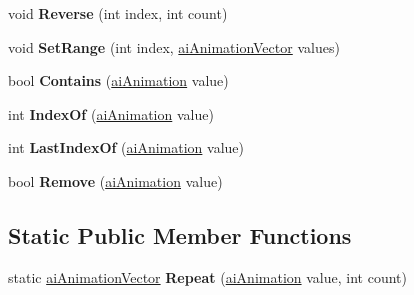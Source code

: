 \begin{DoxyCompactItemize}
\item 
\hypertarget{classai_animation_vector_a4d1511f222d1b415b7b143b6735d78fb}{void {\bfseries Reverse} (int index, int count)}\label{classai_animation_vector_a4d1511f222d1b415b7b143b6735d78fb}

\item 
\hypertarget{classai_animation_vector_ac37cdd8151e02c34596b12393e505fb6}{void {\bfseries Set\+Range} (int index, \hyperlink{classai_animation_vector}{ai\+Animation\+Vector} values)}\label{classai_animation_vector_ac37cdd8151e02c34596b12393e505fb6}

\item 
\hypertarget{classai_animation_vector_a5760273ff2895204a65b5662b5a41c82}{bool {\bfseries Contains} (\hyperlink{structai_animation}{ai\+Animation} value)}\label{classai_animation_vector_a5760273ff2895204a65b5662b5a41c82}

\item 
\hypertarget{classai_animation_vector_ad2d1a6fa3c05b11f18ac9f34e6bc17f1}{int {\bfseries Index\+Of} (\hyperlink{structai_animation}{ai\+Animation} value)}\label{classai_animation_vector_ad2d1a6fa3c05b11f18ac9f34e6bc17f1}

\item 
\hypertarget{classai_animation_vector_a4fd57d2551d32f7bbb6dcb59d753e4db}{int {\bfseries Last\+Index\+Of} (\hyperlink{structai_animation}{ai\+Animation} value)}\label{classai_animation_vector_a4fd57d2551d32f7bbb6dcb59d753e4db}

\item 
\hypertarget{classai_animation_vector_aeb48991f501377776566b969413dd92e}{bool {\bfseries Remove} (\hyperlink{structai_animation}{ai\+Animation} value)}\label{classai_animation_vector_aeb48991f501377776566b969413dd92e}

\end{DoxyCompactItemize}
\subsection*{Static Public Member Functions}
\begin{DoxyCompactItemize}
\item 
\hypertarget{classai_animation_vector_a183ed931824ecb2663b34c9ae650cafd}{static \hyperlink{classai_animation_vector}{ai\+Animation\+Vector} {\bfseries Repeat} (\hyperlink{structai_animation}{ai\+Animation} value, int count)}\label{classai_animation_vector_a183ed931824ecb2663b34c9ae650cafd}

\end{DoxyCompactItemize}
